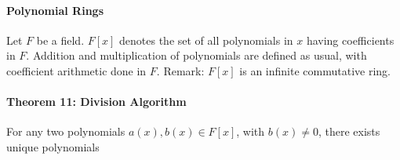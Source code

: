 \documentclass[10pt,letter]{article}
\theoremstyle{plain}
\theoremstyle{definition}
\begin{document}
\paragraph{Polynomial Rings}
Let $F$ be a field. $F[x]$ denotes the set of all polynomials in $x$ having coefficients in $F$. Addition and multiplication of polynomials are defined as usual, with coefficient arithmetic done in $F$. Remark: $F[x]$ is an infinite commutative ring.

\paragraph{Theorem 11: Division Algorithm}
For any two polynomials $a(x),b(x)\in F[x]$, with $b(x)\neq0$, there exists unique polynomials 
\end{document}
